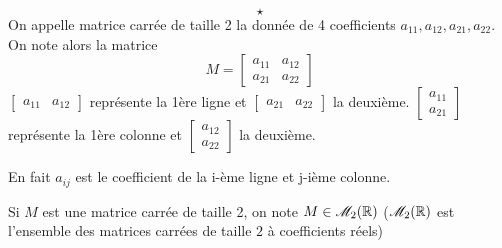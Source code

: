 $$\star$$
On appelle matrice carrée de taille 2 la donnée de 4 coefficients $a_{11},a_{12},a_{21},a_{22}$. On note alors la matrice 
$$
M = 
\begin{bmatrix}
   a_{11} & a_{12} \\
   a_{21} & a_{22} 
\end{bmatrix}
$$
$\begin{bmatrix} a_{11} & a_{12} \end{bmatrix}$ représente la 1ère ligne et $\begin{bmatrix} a_{21} & a_{22} \end{bmatrix}$ la deuxième.\newline
$\begin{bmatrix} a_{11} \\ a_{21} \end{bmatrix}$ représente la 1ère colonne et $\begin{bmatrix} a_{12} \\ a_{22} \end{bmatrix}$ la deuxième. \newline

En fait $a_{ij}$ est le coefficient de la i-ème ligne et j-ième colonne.\newline

Si $M$ est une matrice carrée de taille 2, on note $M \in \mathscr{M}_2(\mathbb{R})$ ($\mathscr{M}_2(\mathbb{R})$ est l'ensemble des matrices carrées de taille $2$ à coefficients réels)\newline

